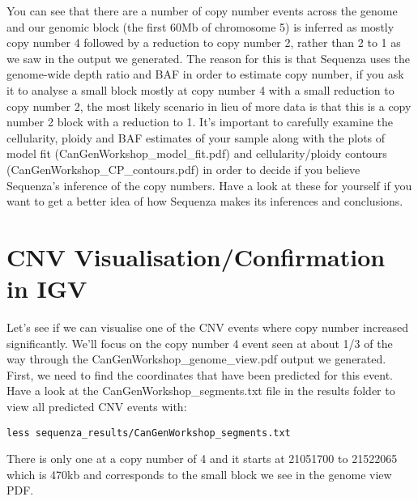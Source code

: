 You can see that there are a number of copy number events across the genome and our genomic block (the first 60Mb of chromosome 5) is inferred as mostly copy number 4 followed by a reduction to copy number 2, rather than 2 to 1 as we saw in the output we generated. The reason for this is that Sequenza uses the genome-wide depth ratio and BAF in order to estimate copy number, if you ask it to analyse a small block mostly at copy number 4 with a small reduction to copy number 2, the most likely scenario in lieu of more data is that this is a copy number 2 block with a reduction to 1. It's important to carefully examine the cellularity, ploidy and BAF estimates of your sample along with the plots of model fit (CanGenWorkshop_model_fit.pdf) and cellularity/ploidy contours (CanGenWorkshop_CP_contours.pdf) in order to decide if you believe Sequenza's inference of the copy numbers. Have a look at these for yourself if you want to get a better idea of how Sequenza makes its inferences and conclusions.


\newpage


\section{CNV Visualisation/Confirmation in IGV}

Let's see if we can visualise one of the CNV events where copy number increased significantly. We'll focus on the copy number 4 event seen at about 1/3 of the way through the CanGenWorkshop\_genome\_view.pdf output we generated. First, we need to find the coordinates that have been predicted for this event. Have a look at the CanGenWorkshop\_segments.txt file in the results folder to view all predicted CNV events with:

\begin{steps}
\begin{lstlisting}
less sequenza_results/CanGenWorkshop_segments.txt
\end{lstlisting}
\end{steps}

There is only one at a copy number of 4 and it starts at 21051700 to 21522065 which is 470kb and corresponds to the small block we see in the genome view PDF.

